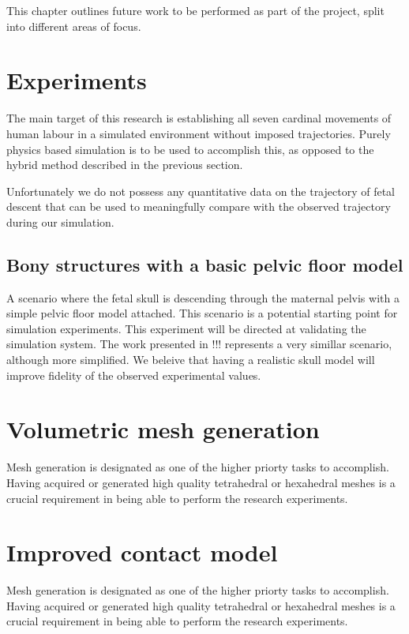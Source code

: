 This chapter outlines future work to be performed as part of the project, split into different areas of focus.

\section{Experiments}

The main target of this research is establishing all seven cardinal movements of human labour in a simulated environment without imposed trajectories. Purely physics based simulation is to be used to accomplish this, as opposed to the hybrid method described in the previous section.

Unfortunately we do not possess any quantitative data on the trajectory of fetal descent that can be used to meaningfully compare with the observed trajectory during our simulation.

\subsection{Bony structures with a basic pelvic floor model}
A scenario where the fetal skull is descending through the maternal pelvis with a simple pelvic floor model attached. This scenario is a potential starting point for simulation experiments. This experiment will be directed at validating the simulation system. The work presented in \cite{parente2014} !!! represents a very simillar scenario, although more simplified. We beleive that having a realistic skull model will improve fidelity of the observed experimental values.

\section{Volumetric mesh generation}\label{future-meshgen}

Mesh generation is designated as one of the higher priorty tasks to accomplish. Having acquired or generated high quality tetrahedral or hexahedral meshes is a crucial requirement in being able to perform the research experiments.

\section{Improved contact model}\label{future-meshgen}

Mesh generation is designated as one of the higher priorty tasks to accomplish. Having acquired or generated high quality tetrahedral or hexahedral meshes is a crucial requirement in being able to perform the research experiments.
